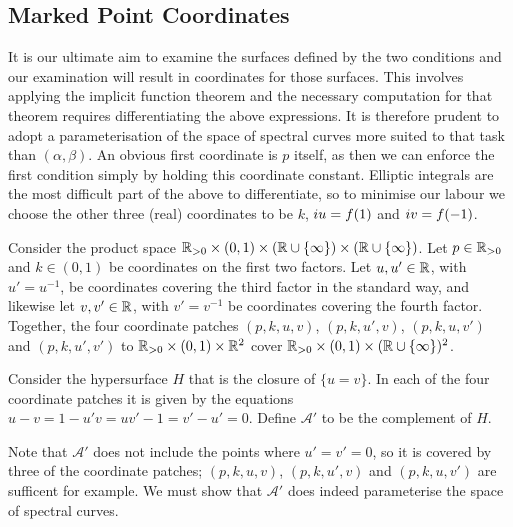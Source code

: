 \subsection{Marked Point Coordinates}
\label{sub:Reformulate}

It is our ultimate aim to examine the surfaces defined by the two conditions and our examination will result in coordinates for those surfaces. This involves applying the implicit function theorem and the necessary computation for that theorem requires differentiating the above expressions. It is therefore prudent to adopt a parameterisation of the space of spectral curves more suited to that task than $(α,β)$. An obvious first coordinate is $p$ itself, as then we can enforce the first condition simply by holding this coordinate constant. Elliptic integrals are the most difficult part of the above to differentiate, so to minimise our labour we choose the other three (real) coordinates to be $k$, $i u = f(1)$ and $i v = f(-1)$.

\begin{defn}\label{def:parameter space}
Consider the product space $\mathbb{R}_{>0} \times (0,1) \times (\mathbb{R}\cup\{\infty\}) \times (\mathbb{R}\cup\{\infty\})$. Let $p \in \mathbb{R}_{>0}$ and $k \in (0,1)$ be coordinates on the first two factors. Let $u, u' \in \mathbb{R}$, with $u' = u^{-1}$, be coordinates covering the third factor in the standard way, and likewise let $v, v' \in\mathbb{R}$, with $v' = v^{-1}$ be coordinates covering the fourth factor. Together, the four coordinate patches $(p,k,u,v)$, $(p,k,u',v)$, $(p,k,u,v')$ and $(p,k,u',v')$ to $\mathbb{R}_{>0} \times (0,1) \times \mathbb{R}^2$ cover $\mathbb{R}_{>0} \times (0,1) \times (\mathbb{R}\cup\{\infty\})^2$.

Consider the hypersurface $H$ that is the closure of $\{u=v\}$. In each of the four coordinate patches it is given by the equations $u-v = 1-u'v = uv'- 1 = v' - u' = 0$. Define $\mathcal{A}'$ to be the complement of $H$.
\end{defn}

Note that $\mathcal{A}'$ does not include the points where $u'=v'=0$, so it is covered by three of the coordinate patches; $(p,k,u,v)$, $(p,k,u',v)$ and $(p,k,u,v')$ are sufficent for example. We must show that $\mathcal{A}'$ does indeed parameterise the space of spectral curves.


